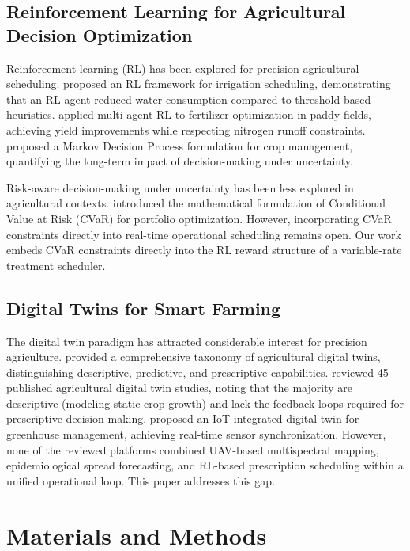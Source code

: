 \documentclass[review,3p,times,authoryear]{elsarticle}
\begin{document}
\subsection{Reinforcement Learning for Agricultural Decision Optimization}
Reinforcement learning (RL) has been explored for precision agricultural scheduling. \citet{yang2020} proposed an RL framework for irrigation scheduling, demonstrating that an RL agent reduced water consumption compared to threshold-based heuristics. \citet{geng2023multiagent} applied multi-agent RL to fertilizer optimization in paddy fields, achieving yield improvements while respecting nitrogen runoff constraints. \citet{mesafrias2013quantifying} proposed a Markov Decision Process formulation for crop management, quantifying the long-term impact of decision-making under uncertainty.

Risk-aware decision-making under uncertainty has been less explored in agricultural contexts. \citet{rockafellar2000optimization} introduced the mathematical formulation of Conditional Value at Risk (CVaR) for portfolio optimization. However, incorporating CVaR constraints directly into real-time operational scheduling remains open. Our work embeds CVaR constraints directly into the RL reward structure of a variable-rate treatment scheduler.

\subsection{Digital Twins for Smart Farming}
The digital twin paradigm has attracted considerable interest for precision agriculture. \citet{verdouw2021} provided a comprehensive taxonomy of agricultural digital twins, distinguishing descriptive, predictive, and prescriptive capabilities. \citet{pylianidis2021} reviewed 45 published agricultural digital twin studies, noting that the majority are descriptive (modeling static crop growth) and lack the feedback loops required for prescriptive decision-making. \citet{shaikh2022towards} proposed an IoT-integrated digital twin for greenhouse management, achieving real-time sensor synchronization. However, none of the reviewed platforms combined UAV-based multispectral mapping, epidemiological spread forecasting, and RL-based prescription scheduling within a unified operational loop. This paper addresses this gap.

\section{Materials and Methods}
\end{document}

